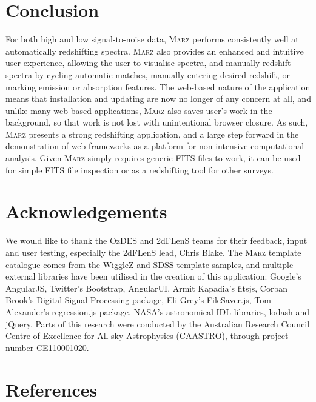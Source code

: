 \documentclass[5p]{elsarticle}
\newcommand{\marz}{\textsc{Marz}}
\begin{document}
\section{Conclusion} \label{sec:conclusion}
For both high and low signal-to-noise data, \marz{} performs consistently well at automatically redshifting spectra. \marz{} also provides an enhanced and intuitive user experience, allowing the user to visualise spectra, and manually redshift spectra by cycling automatic matches, manually entering desired redshift, or marking emission or absorption features. The web-based nature of the application means that installation and updating are now no longer of any concern at all, and unlike many web-based applications, \marz{} also saves user's work in the background, so that work is not lost with unintentional browser closure. As such, \marz{} presents a strong redshifting application, and a large step forward in the demonstration of web frameworks as a platform for non-intensive computational analysis. Given \marz{} simply requires generic FITS files to work, it can be used for simple FITS file inspection or as a redshifting tool for other surveys.

\section*{Acknowledgements}
We would like to thank the OzDES and 2dFLenS teams for their feedback, input and user testing, especially the 2dFLenS lead, Chris Blake. The \marz{} template catalogue comes from the WiggleZ and SDSS template samples, and multiple external libraries have been utilised in the creation of this application: Google's AngularJS, Twitter's Bootstrap, AngularUI, Armit Kapadia's fitsjs, Corban Brook's Digital Signal Processing package, Eli Grey's FileSaver.js, Tom Alexander's regression.js package, NASA's astronomical IDL libraries, lodash and jQuery. Parts of this research were conducted by the Australian Research Council Centre of Excellence for All-sky Astrophysics (CAASTRO), through project number CE110001020.

\newpage 
\section*{References}


%
%
\end{document}
